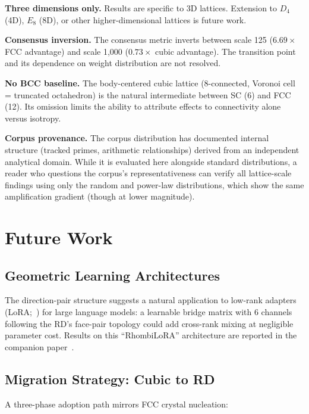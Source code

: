 \documentclass[11pt]{article}
\begin{document}
\textbf{Three dimensions only.} Results are specific to 3D
lattices. Extension to $D_4$ (4D), $E_8$ (8D), or other
higher-dimensional lattices is future work.

\textbf{Consensus inversion.} The consensus metric inverts between
scale 125 ($6.69\times$ FCC advantage) and scale 1{,}000
($0.73\times$ cubic advantage). The transition point and its
dependence on weight distribution are not resolved.

\textbf{No BCC baseline.} The body-centered cubic lattice (8-connected,
Voronoi cell = truncated octahedron) is the natural intermediate
between SC (6) and FCC (12). Its omission limits the ability to
attribute effects to connectivity alone versus isotropy.

\textbf{Corpus provenance.} The corpus distribution has documented
internal structure (tracked primes, arithmetic relationships)
derived from an independent analytical domain. While it is
evaluated here alongside standard distributions, a reader who
questions the corpus's representativeness can verify all
lattice-scale findings using only the random and power-law
distributions, which show the same amplification gradient (though
at lower magnitude).

\section{Future Work}
\label{sec:future}

\subsection{Geometric Learning Architectures}

The direction-pair structure suggests a natural application to
low-rank adapters (LoRA;~\citealt{hu2022lora}) for large language models: a learnable
bridge matrix with 6 channels following the RD's face-pair topology
could add cross-rank mixing at negligible parameter cost.
Results on this ``RhombiLoRA'' architecture are reported in the
companion paper~\cite{bielec2026bridge}.

\subsection{Migration Strategy: Cubic to RD}
\label{sec:migration}

A three-phase adoption path mirrors FCC crystal nucleation:
\end{document}
